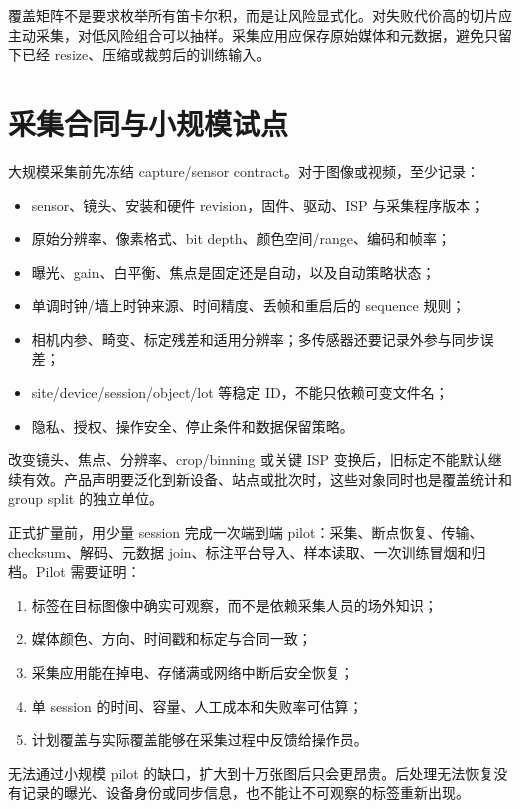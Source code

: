 覆盖矩阵不是要求枚举所有笛卡尔积，而是让风险显式化。对失败代价高的切片应主动采集，对低风险组合可以抽样。采集应用应保存原始媒体和元数据，避免只留下已经 resize、压缩或裁剪后的训练输入。

\section{采集合同与小规模试点}

大规模采集前先冻结 capture/sensor contract。对于图像或视频，至少记录：

\begin{itemize}
  \item sensor、镜头、安装和硬件 revision，固件、驱动、ISP 与采集程序版本；
  \item 原始分辨率、像素格式、bit depth、颜色空间/range、编码和帧率；
  \item 曝光、gain、白平衡、焦点是固定还是自动，以及自动策略状态；
  \item 单调时钟/墙上时钟来源、时间精度、丢帧和重启后的 sequence 规则；
  \item 相机内参、畸变、标定残差和适用分辨率；多传感器还要记录外参与同步误差；
  \item site/device/session/object/lot 等稳定 ID，不能只依赖可变文件名；
  \item 隐私、授权、操作安全、停止条件和数据保留策略。
\end{itemize}

改变镜头、焦点、分辨率、crop/binning 或关键 ISP 变换后，旧标定不能默认继续有效。产品声明要泛化到新设备、站点或批次时，这些对象同时也是覆盖统计和 group split 的独立单位。

正式扩量前，用少量 session 完成一次端到端 pilot：采集、断点恢复、传输、checksum、解码、元数据 join、标注平台导入、样本读取、一次训练冒烟和归档。Pilot 需要证明：

\begin{enumerate}
  \item 标签在目标图像中确实可观察，而不是依赖采集人员的场外知识；
  \item 媒体颜色、方向、时间戳和标定与合同一致；
  \item 采集应用能在掉电、存储满或网络中断后安全恢复；
  \item 单 session 的时间、容量、人工成本和失败率可估算；
  \item 计划覆盖与实际覆盖能够在采集过程中反馈给操作员。
\end{enumerate}

无法通过小规模 pilot 的缺口，扩大到十万张图后只会更昂贵。后处理无法恢复没有记录的曝光、设备身份或同步信息，也不能让不可观察的标签重新出现。


